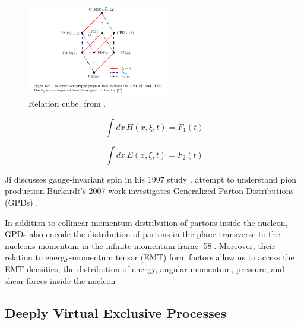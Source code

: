             \begin{figure}[H]
                \centering
                \includegraphics[width=0.55\textwidth,trim={3cm 1.5cm 3cm 0},clip]{Chapters/Ch1-Intro/Ch1-Sec2-GPDs-DVMP/pics/gtmd-cube-sangbaek.png}
                \caption{Relation cube, from \parencite{Burkardt2016ModellingStructure}. }
                \label{fig:gmtd_cube}
            \end{figure}
        
        \begin{equation}\label{gpd_f1}
        \int dx \, H(x, \xi, t) = F_1(t)
        \end{equation}
        
        \begin{equation}\label{gpd_f2}
        \int dx \, E(x, \xi, t) = F_2(t)
        \end{equation}

        

             Ji discusses gauge-invariant spin in his 1997 study \parencite{Ji1997Gauge-InvariantSpin}.
            attempt to understand pion production \parencite{Goloskokov2010AnElectroproduction}
            Burkardt's 2007 work investigates Generalized Parton Distributions (GPDs) \parencite{Burkardt2007GPDs0}.
            

    

        In addition to collinear momentum distribution of partons inside the
        nucleon, GPDs also encode the distribution of partons in the plane transverse to
        the nucleons momentum in the infinite momentum frame [58]. Moreover, their
        relation to energy-momentum tensor (EMT) form factors allow us to access the
        EMT densities, the distribution of energy, angular momentum, pressure, and shear
        forces inside the nucleon     
       
    
    
    \subsection{Deeply Virtual Exclusive Processes}

